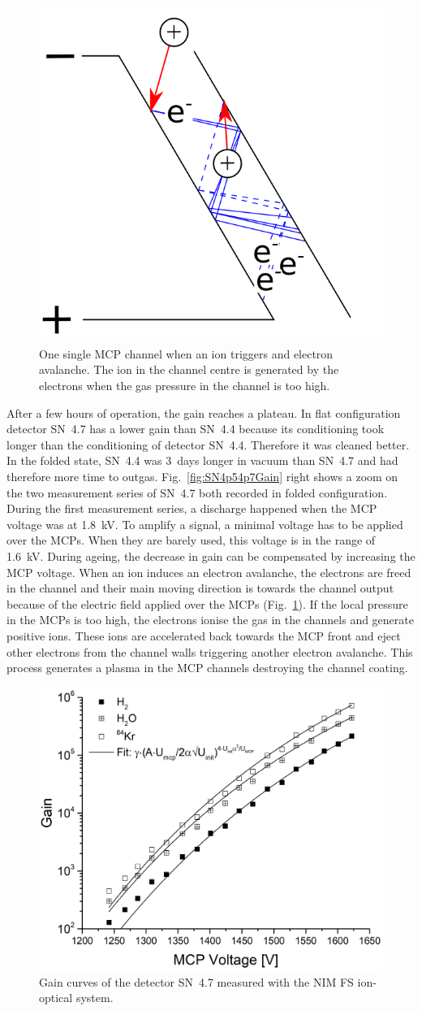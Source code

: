 	\begin{figure}[h!]
		\centering
		\includegraphics[width=.3\textwidth]{Experiments/DischargeMod.png}
		\caption{One single MCP channel when an ion triggers and electron avalanche. The ion in the channel centre is generated by the electrons when the gas pressure in the channel is too high.}
		\label{fig:expDischMod}
	\end{figure}
	After a few hours of operation, the gain reaches a plateau. In flat configuration detector SN~4.7 has a lower gain than SN~4.4 because its conditioning took longer than the conditioning of detector SN~4.4. Therefore it was cleaned better. In the folded state, SN~4.4 was 3~days longer in vacuum than SN~4.7 and had therefore more time to outgas. Fig.~\ref{fig:SN4p54p7Gain} right shows a zoom on the two measurement series of SN~4.7 both recorded in folded configuration. During the first measurement series, a discharge happened when the MCP voltage was at 1.8~kV. To amplify a signal, a minimal voltage has to be applied over the MCPs. When they are barely used, this voltage is in the range of 1.6~kV. During ageing, the decrease in gain can be compensated by increasing the MCP voltage. When an ion induces an electron avalanche, the electrons are freed in the channel and their main moving direction is towards the channel output because of the electric field applied over the MCPs (Fig.~\ref{fig:expDischMod}). If the local pressure in the MCPs is too high, the electrons ionise the gas in the channels and generate positive ions. These ions are accelerated back towards the MCP front and eject other electrons from the channel walls triggering another electron avalanche. This process generates a plasma in the MCP channels destroying the channel coating.
	\begin{figure}[h!] %
		\centering
		\includegraphics[width=.7\textwidth]{Experiments/GainDetFSLabEl.png}
		\caption{Gain curves of the detector SN~4.7 measured with the NIM FS ion-optical system.}
		\label{fig:MCPGainCurve4p7}
	\end{figure}
